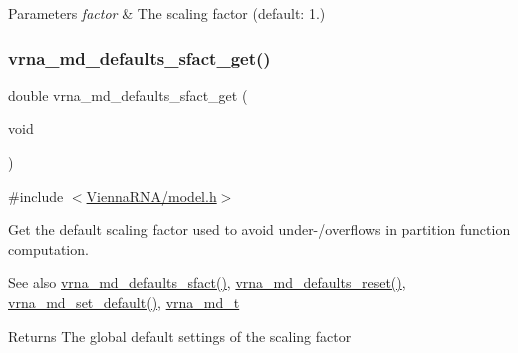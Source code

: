\begin{DoxyParams}{Parameters}
{\em factor} & The scaling factor (default\+: 1.) \\
\hline
\end{DoxyParams}
\mbox{\label{group__model__details_gab2df6aab954b63fd3592d18e90285dae}} 
\subsubsection{\texorpdfstring{vrna\+\_\+md\+\_\+defaults\+\_\+sfact\+\_\+get()}{vrna\_md\_defaults\_sfact\_get()}}
{\footnotesize\ttfamily double vrna\+\_\+md\+\_\+defaults\+\_\+sfact\+\_\+get (\begin{DoxyParamCaption}\item[{void}]{ }\end{DoxyParamCaption})}



{\ttfamily \#include $<$\hyperlink{model_8h}{Vienna\+R\+N\+A/model.\+h}$>$}



Get the default scaling factor used to avoid under-\//overflows in partition function computation. 

\begin{DoxySeeAlso}{See also}
\hyperlink{group__model__details_ga3f73d3029d3d0025d4cc311510cd95a3}{vrna\+\_\+md\+\_\+defaults\+\_\+sfact()}, \hyperlink{group__model__details_ga70834424cf804d149937de89f80ceb45}{vrna\+\_\+md\+\_\+defaults\+\_\+reset()}, \hyperlink{group__model__details_ga8ac6ff84936282436f822644bf841f66}{vrna\+\_\+md\+\_\+set\+\_\+default()}, \hyperlink{group__model__details_ga1f8a10e12a0a1915f2a4eff0b28ea17c}{vrna\+\_\+md\+\_\+t} 
\end{DoxySeeAlso}
\begin{DoxyReturn}{Returns}
The global default settings of the scaling factor 
\end{DoxyReturn}
\mbox{\label{group__model__details_gabad896c3650d420f3f3ddefc69e2bceb}} 
